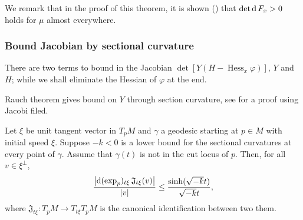 We remark that in the proof of this theorem,
it is shown (\cite[Claim 4.3 and Claim 4.4]{cordero2001riemannian}) that
$\det \operatorname{d} F_x > 0$ holds for $\mu$ almost everywhere.

\subsubsection{Bound Jacobian by sectional curvature}

There are two terms to bound in the Jacobian $\det[ Y(H - \operatorname{Hess}_x \varphi)]$, $Y$ and $H$;
while we shall eliminate the Hessian of $\varphi$ at the end.

Rauch theorem gives bound on $Y$ through section curvature, see
\cite[Theorem IX.2.3]{chavel2006riemannian} for a proof using Jacobi filed.
\begin{prop} 
	Let $\xi$ be unit tangent vector in $T_p M$
	and $\gamma$ a geodesic starting at $p \in M$ with initial speed $\xi$.
	Suppose \( - k < 0 \) is a lower bound for
	the sectional curvatures at every point of \( \gamma \).
	Assume that \( \gamma (t)\) is not in the cut locus of $p$.
	Then, for all \( v \in \xi ^ { \perp } \),
	\begin{equation*}
		\frac { \left| \operatorname{d} ( \exp _ { p })  _ {t \xi } \,
			\mathfrak{J}_{t \xi}( v )\right| } { | v | }
		\leq \frac { \sinh (\sqrt{ -k } t )} {\sqrt{-k} t },
	\end{equation*}
	where $\mathfrak{J}_{t \xi}: T_p M \rightarrow T_{t \xi} T_p M$ is the canonical identification
	between two them.
\end{prop}

